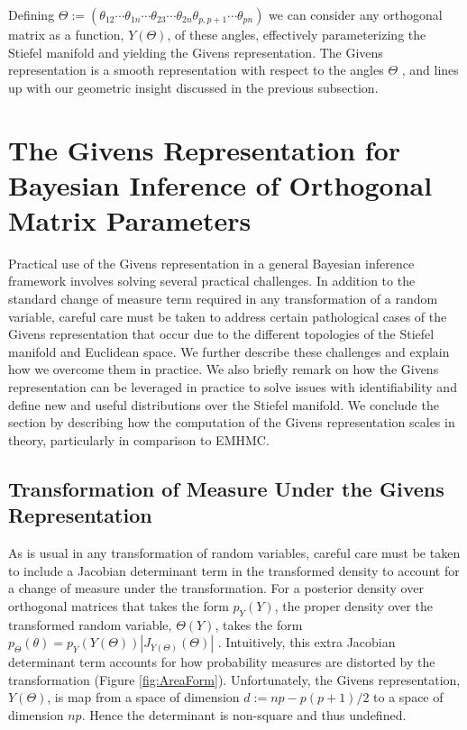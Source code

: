 \documentclass[ba]{imsart}
\numberwithin{equation}{section}
\theoremstyle{plain}
\begin{document}
\noindent Defining $\Theta := (\theta_{12} \cdots \theta_{1n} \cdots \theta_{23} \cdots \theta_{2n} \theta_{p,p+1} \cdots \theta_{pn})$ we can consider any orthogonal matrix as a function, $Y(\Theta)$, of these angles, effectively parameterizing the Stiefel manifold and yielding the Givens representation. The Givens representation is a smooth representation with respect to the angles $\Theta$ \citep{shepard2015representation},  and lines up with our geometric insight discussed in the previous subsection.


\section{The Givens Representation for Bayesian Inference of Orthogonal Matrix Parameters} \label{implementation}

Practical use of the Givens representation in a general Bayesian inference framework involves solving several practical challenges. In addition to the standard change of measure term required in any transformation of a random variable, careful care must be taken to address certain pathological cases of the Givens representation that occur due to the different topologies of the Stiefel manifold and Euclidean space. We further describe these challenges and explain how we overcome them in practice. We also briefly remark on how the Givens representation can be leveraged in practice to solve issues with identifiability and define new and useful distributions over the Stiefel manifold. We conclude the section by describing how the computation of the Givens representation scales in theory, particularly in comparison to EMHMC.

\subsection{Transformation of Measure Under the Givens Representation}\label{measureGivens}
As is usual in any transformation of random variables, careful care must be taken to include a Jacobian determinant term in the transformed density to account for a change of measure under the transformation. For a posterior density over orthogonal matrices that takes the form $p_Y(Y)$, the proper density over the transformed random variable, $\Theta(Y)$, takes the form $p_\Theta(\theta) = p_{Y}(Y(\Theta)) |J_{Y(\Theta)}(\Theta)|$ \citep{keener2011theoretical}. Intuitively, this extra Jacobian determinant term accounts for how probability measures are distorted by the transformation (Figure \ref{fig:AreaForm}). Unfortunately, the Givens representation, $Y(\Theta)$, is map from a space of dimension $d := np - p(p+1)/2$ to a space of dimension $np$. Hence the determinant is non-square and thus undefined.
\end{document}

